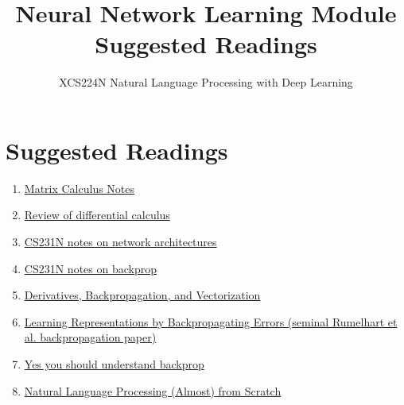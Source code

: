 \documentclass{article}
\title{Neural Network Learning Module Suggested Readings}
\author{XCS224N Natural Language Processing with Deep Learning}
\date{}
\begin{document}
\maketitle

\section{Suggested Readings}
\begin{enumerate}
    \item \href{http://web.stanford.edu/class/cs224n/readings/gradient-notes.pdf}{Matrix Calculus Notes}
    \item \href{http://web.stanford.edu/class/cs224n/readings/review-differential-calculus.pdf}{Review of differential calculus}
    \item \href{https://cs231n.github.io/neural-networks-1/}{CS231N notes on network architectures}
    \item \href{https://cs231n.github.io/optimization-2/}{CS231N notes on backprop}
    \item \href{http://cs231n.stanford.edu/handouts/derivatives.pdf}{Derivatives, Backpropagation, and Vectorization}
    \item \href{http://www.iro.umontreal.ca/~vincentp/ift3395/lectures/backprop_old.pdf}{Learning Representations by Backpropagating Errors (seminal Rumelhart et al. backpropagation paper)}
    \item \href{https://karpathy.medium.com/yes-you-should-understand-backprop-e2f06eab496b}{Yes you should understand backprop}
    \item \href{https://www.jmlr.org/papers/volume12/collobert11a/collobert11a.pdf}{Natural Language Processing (Almost) from Scratch}
\end{enumerate}
\end{document}
